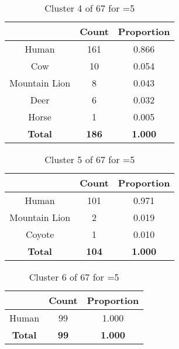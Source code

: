 \begin{table}[ht!]
\centering
\begin{tabular}{|c|c|c|}
\hline
\bf \Spec{} &\bf Count &\bf Proportion\\ \hline \hline
Human & 161 & 0.866\\ \hline
Cow & 10 & 0.054\\ \hline
Mountain Lion & 8 & 0.043\\ \hline
Deer & 6 & 0.032\\ \hline
Horse & 1 & 0.005\\ \hline
\hline
\bf Total & \bf 186 & \bf 1.000\\ \hline
\end{tabular}
\label{tab:cluster:4:5}
\caption{Cluster 4 of 67 for \minneigh{}=5}
\end{table}

\begin{table}[ht!]
\centering
\begin{tabular}{|c|c|c|}
\hline
\bf \Spec{} &\bf Count &\bf Proportion\\ \hline \hline
Human & 101 & 0.971\\ \hline
Mountain Lion & 2 & 0.019\\ \hline
Coyote & 1 & 0.010\\ \hline
\hline
\bf Total & \bf 104 & \bf 1.000\\ \hline
\end{tabular}
\label{tab:cluster:5:5}
\caption{Cluster 5 of 67 for \minneigh{}=5}
\end{table}

\begin{table}[ht!]
\centering
\begin{tabular}{|c|c|c|}
\hline
\bf \Spec{} &\bf Count &\bf Proportion\\ \hline \hline
Human & 99 & 1.000\\ \hline
\hline
\bf Total & \bf 99 & \bf 1.000\\ \hline
\end{tabular}
\label{tab:cluster:6:5}
\caption{Cluster 6 of 67 for \minneigh{}=5}
\end{table}

